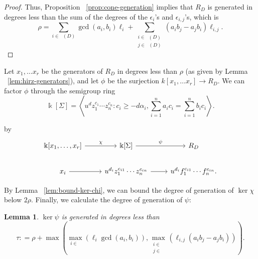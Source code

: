 \documentclass{amsart}
\theoremstyle{plain}
\newtheorem{lem}[thm]{Lemma}
\theoremstyle{definition}
\theoremstyle{remark}
\numberwithin{equation}{section}
\newcommand\bk{{\Bbbk}}
\newcommand\bida{a}
\newcommand\bidb{b}
\DeclareMathOperator{\Te}{T_=}
\DeclareMathOperator{\Tp}{T_+}
\DeclareMathOperator{\Tm}{T_-}
\begin{document}
\begin{proof}
Thus, Proposition ~\ref{prop:cone-generation} implies that 
$R_D$ is generated in 
degrees less than the sum of the degrees of the $\epsilon_i$'s and $\epsilon_{i,j}$'s, which is
\[
	\rho = \sum_{i\in \Te(D)} \gcd(\bida_i, \bidb_i)\ell_i + \sum_{\substack{
	i \in \Tp(D) \\	j \in \Tm(D)}} (\bida_i \bidb_j- \bida_j \bidb_i)\ell_{i,j}.
\]
\end{proof}

Let $x_1, \ldots x_r$ be the generators of $R_D$ in degrees less than $\rho$
(as given by Lemma ~\ref{lem:hirz-generators}), and let $\phi$ be the
surjection $k[x_1, \ldots x_r] \to R_D$.  We can factor $\phi$ through the
semigroup ring 
\[
	\bk[\Sigma] = \left \langle u^d z_1^{c_1} \cdots z_n^{c_n} : c_i \geq -d
	\alpha_i, \sum_{i=1}^{n} \bida_i c_i = \sum_{i=1}^{n} \bidb_i c_i
	\right \rangle.
\]

\noindent
by
\[
\begin{tikzcd}
	\bk[x_1,\ldots, x_r] \ar {r}{\chi} & \bk[\Sigma] \ar {r}{\psi} & R_D \\
	x_i \ar r & u^{d_i}z_1^{c_{i1}} \cdots z_n^{c_{in}} \ar r & u^{d_i}f_1^{c_{i1}} \cdots f_n^{c_{in}}.
\end{tikzcd}
\]

By Lemma ~\ref{lem:bound-ker-chi}, we can bound the degree of generation of $\ker \chi$ below
$2 \rho$.
Finally, we calculate the degree of generation of $\psi$:

\begin{lem}
\label{lem:hirz-bound-ker-psi}
$\ker \psi$ is generated in degrees less than
\[
	\tau : = \rho
	+ \max \left(\max_{i\in \Te}(\ell_i \gcd(a_i, b_i)), \max_{\substack{
	i \in	\Tp \\ j\in \Tm}} (\ell_{i,j} (\bida_i \bidb_j - \bida_j \bidb_i))
	\right).
\]
\end{lem}
\end{document}
